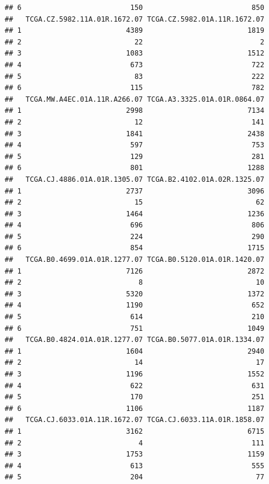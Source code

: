 \documentclass[
]{article}
\begin{document}
\begin{verbatim}
## 6                          150                          850
##   TCGA.CZ.5982.11A.01R.1672.07 TCGA.CZ.5982.01A.11R.1672.07
## 1                         4389                         1819
## 2                           22                            2
## 3                         1083                         1512
## 4                          673                          722
## 5                           83                          222
## 6                          115                          782
##   TCGA.MW.A4EC.01A.11R.A266.07 TCGA.A3.3325.01A.01R.0864.07
## 1                         2998                         7134
## 2                           12                          141
## 3                         1841                         2438
## 4                          597                          753
## 5                          129                          281
## 6                          801                         1288
##   TCGA.CJ.4886.01A.01R.1305.07 TCGA.B2.4102.01A.02R.1325.07
## 1                         2737                         3096
## 2                           15                           62
## 3                         1464                         1236
## 4                          696                          806
## 5                          224                          290
## 6                          854                         1715
##   TCGA.B0.4699.01A.01R.1277.07 TCGA.B0.5120.01A.01R.1420.07
## 1                         7126                         2872
## 2                            8                           10
## 3                         5320                         1372
## 4                         1190                          652
## 5                          614                          210
## 6                          751                         1049
##   TCGA.B0.4824.01A.01R.1277.07 TCGA.B0.5077.01A.01R.1334.07
## 1                         1604                         2940
## 2                           14                           17
## 3                         1196                         1552
## 4                          622                          631
## 5                          170                          251
## 6                         1106                         1187
##   TCGA.CJ.6033.01A.11R.1672.07 TCGA.CJ.6033.11A.01R.1858.07
## 1                         3162                         6715
## 2                            4                          111
## 3                         1753                         1159
## 4                          613                          555
## 5                          204                           77

\end{verbatim}
\end{document}
